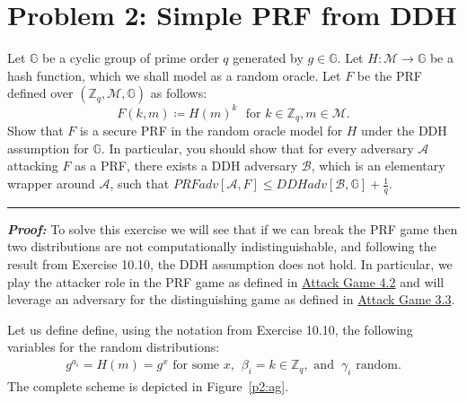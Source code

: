 \section{Problem 2: Simple PRF from DDH}\label{sec:problem2}

Let $\mathbb{G}$ be a cyclic group of prime order $q$ generated by $g \in \mathbb{G}$.
Let $H : \mathcal{M} \rightarrow \mathbb{G}$ be a hash function, which we shall model as a random oracle.
Let $F$ be the PRF defined over $(\mathbb{Z}_{q},\mathcal{M},\mathbb{G})$ as follows:
\begin{equation*}
    F(k,m) \coloneqq H(m)^{k} \hspace{8pt} \text{for } k \in \mathbb{Z}_{q}, m \in \mathcal{M}.
\end{equation*}
Show that $F$ is a secure PRF in the random oracle model for $H$ under the DDH assumption for $\mathbb{G}$.
In particular, you should show that for every adversary $\mathcal{A}$ attacking $F$ as a PRF, there exists a DDH adversary $\mathcal{B}$, which is an elementary wrapper around $\mathcal{A}$, such that $PRFadv[\mathcal{A}, F] \leq DDHadv[\mathcal{B}, \mathbb{G}] + \frac{1}{q}$.

\begin{center}
    \rule{5cm}{0.4pt}
\end{center}

\textbf{\textit{Proof:}}
To solve this exercise we will see that if we can break the PRF game then two distributions are not computationally indistinguishable, and following the result from Exercise 10.10, the DDH assumption does not hold.
In particular, we play the attacker role in the PRF game as defined in \hyperref[ag:4-2]{Attack Game 4.2} and will leverage an adversary for the distinguishing game as defined in \hyperref[ag:3-3]{Attack Game 3.3}.

Let us define define, using the notation from Exercise 10.10, the following variables for the random distributions:
\begin{equation*}
    \begin{split}
        g^{a_i} = H(m) = g^x \text{ for some $x$, } \hspace{3pt} \beta_i = k \in \mathbb{Z}_q, \text{ and } \hspace{3pt} \gamma_i \text{ random}.
    \end{split}
\end{equation*}
The complete scheme is depicted in Figure~\ref{p2:ag}.

